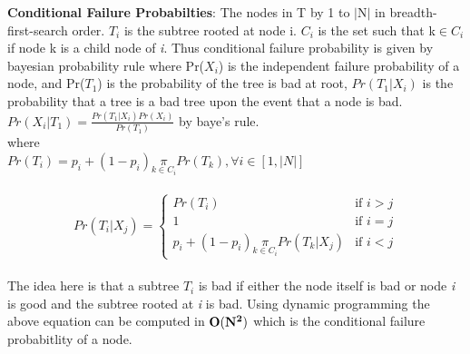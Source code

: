 \documentclass[10pt]{sigplan-proc-varsize}
\begin{document}
{\bf Conditional Failure Probabilties}: The nodes in T by 1 to $|$N$|$ in breadth- first-search order. $T_i$ is the subtree rooted at node i. $C_i$ is the set such that k$\in$$C_i$ if node k is a   child node of {\it i}. Thus conditional failure probability is given by bayesian probability rule where Pr($X_i$) is the independent failure probability of a node, and Pr($T_1$) is the probability of the tree is bad at root, $Pr(T_1|X_i)$ is the probability that a tree is a bad tree upon the event that a node is bad. \\
$Pr(X_i|T_1) = \frac{Pr(T_1|X_i)Pr(X_i)}{Pr(T_1)}$ by baye's rule.\\
where\\
$Pr(T_i) = p_i+(1-p_i) \underset{k{\in}C_i}{\pi}Pr(T_k) , \forall i \in [1,|N|]$\\
\\

\[
 Pr(T_i|X_j) =
  \begin{cases}
   Pr(T_i) & \text{if } i > j \\
   1       & \text{if } i=j \\
   p_i+(1-p_i)  \underset{k{\in}C_i}{\pi} Pr(T_k|X_j)  & \text{if } i<j
  \end{cases}
\] \\

The idea here is that a subtree $T_i$ is bad if either the node itself is bad or node {\it i} is good and the subtree rooted at {\it i} is bad. Using dynamic programming the above equation can be computed in ${\bf O(N^2)}$ which is the conditional failure probabitlity of a node. 
\end{document}
